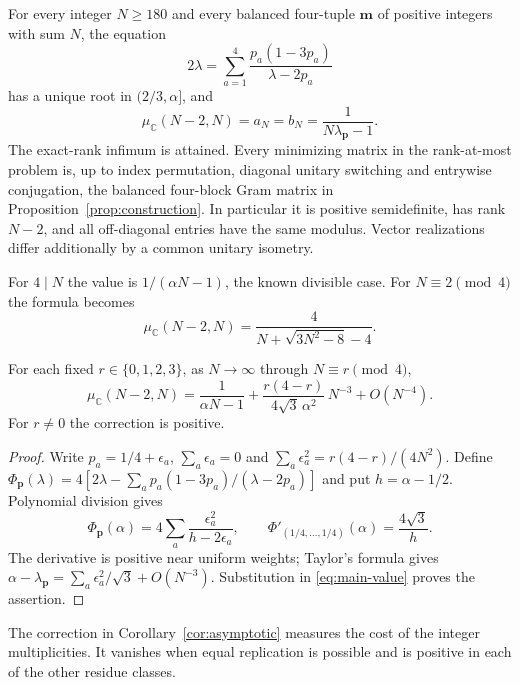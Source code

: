 \begin{theorem}\label{thm:main}
For every integer $N\geq180$ and every balanced four-tuple
$\boldsymbol m$ of positive integers with sum $N$, the equation
\begin{equation}\label{eq:main-root}
 2\lambda=\sum_{a=1}^4\frac{p_a(1-3p_a)}{\lambda-2p_a}
\end{equation}
has a unique root in $(2/3,\alpha]$, and
\begin{equation}\label{eq:main-value}
 \mu_{\mathbb C}(N-2,N)=a_N=b_N=
 \frac1{N\lambda_{\boldsymbol p}-1}.
\end{equation}
The exact-rank infimum is attained. Every minimizing matrix in the
rank-at-most problem is, up to index permutation, diagonal unitary
switching and entrywise conjugation, the balanced four-block Gram matrix
in Proposition~\ref{prop:construction}. In particular it is positive semidefinite,
has rank $N-2$, and all off-diagonal entries have the same modulus.
Vector realizations differ additionally by a common unitary isometry.
\end{theorem}

For $4\mid N$ the value is $1/(\alpha N-1)$, the known divisible case.
For $N\equiv2\pmod4$ the formula becomes
\begin{equation}\label{eq:residue-two}
 \mu_{\mathbb C}(N-2,N)=
 \frac4{N+\sqrt{3N^2-8}-4}.
\end{equation}

\begin{corollary}\label{cor:asymptotic}
For each fixed $r\in\{0,1,2,3\}$, as $N\longrightarrow\infty$ through
$N\equiv r\pmod4$,
\[
 \mu_{\mathbb C}(N-2,N)=\frac1{\alpha N-1}
 +\frac{r(4-r)}{4\sqrt3\,\alpha^2}\,N^{-3}+O(N^{-4}).
\]
For $r\ne0$ the correction is positive.
\end{corollary}
\begin{proof}
Write $p_a=1/4+\epsilon_a$, $\sum_a\epsilon_a=0$ and
$\sum_a\epsilon_a^2=r(4-r)/(4N^2)$. Define
$\Phi_{\boldsymbol p}(\lambda)=4[2\lambda-
\sum_ap_a(1-3p_a)/(\lambda-2p_a)]$ and put $h=\alpha-1/2$.
Polynomial division gives
\[
 \Phi_{\boldsymbol p}(\alpha)
 =4\sum_a\frac{\epsilon_a^2}{h-2\epsilon_a},\qquad
 \Phi'_{(1/4,\ldots,1/4)}(\alpha)=\frac{4\sqrt3}{h}.
\]
The derivative is positive near uniform weights; Taylor's formula gives
$\alpha-\lambda_{\boldsymbol p}
=\sum_a\epsilon_a^2/\sqrt3+O(N^{-3})$.
Substitution in \eqref{eq:main-value} proves the assertion.
\end{proof}

The correction in Corollary~\ref{cor:asymptotic} measures the cost of the
integer multiplicities. It vanishes when equal replication is possible
and is positive in each of the other residue classes.

